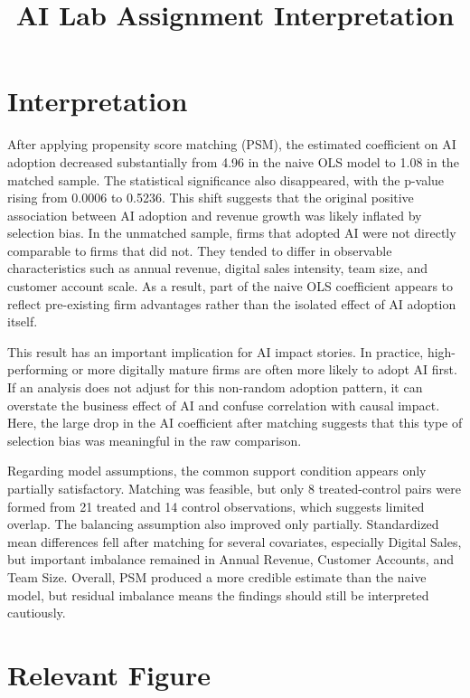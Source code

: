 \documentclass[12pt]{article}
\title{AI Lab Assignment Interpretation}
\author{}
\date{}
\begin{document}
\maketitle

\section*{Interpretation}

After applying propensity score matching (PSM), the estimated coefficient on AI adoption decreased substantially from 4.96 in the naive OLS model to 1.08 in the matched sample. The statistical significance also disappeared, with the p-value rising from 0.0006 to 0.5236. This shift suggests that the original positive association between AI adoption and revenue growth was likely inflated by selection bias. In the unmatched sample, firms that adopted AI were not directly comparable to firms that did not. They tended to differ in observable characteristics such as annual revenue, digital sales intensity, team size, and customer account scale. As a result, part of the naive OLS coefficient appears to reflect pre-existing firm advantages rather than the isolated effect of AI adoption itself.

This result has an important implication for AI impact stories. In practice, high-performing or more digitally mature firms are often more likely to adopt AI first. If an analysis does not adjust for this non-random adoption pattern, it can overstate the business effect of AI and confuse correlation with causal impact. Here, the large drop in the AI coefficient after matching suggests that this type of selection bias was meaningful in the raw comparison.

Regarding model assumptions, the common support condition appears only partially satisfactory. Matching was feasible, but only 8 treated-control pairs were formed from 21 treated and 14 control observations, which suggests limited overlap. The balancing assumption also improved only partially. Standardized mean differences fell after matching for several covariates, especially Digital Sales, but important imbalance remained in Annual Revenue, Customer Accounts, and Team Size. Overall, PSM produced a more credible estimate than the naive model, but residual imbalance means the findings should still be interpreted cautiously.

\section*{Relevant Figure}
\end{document}
